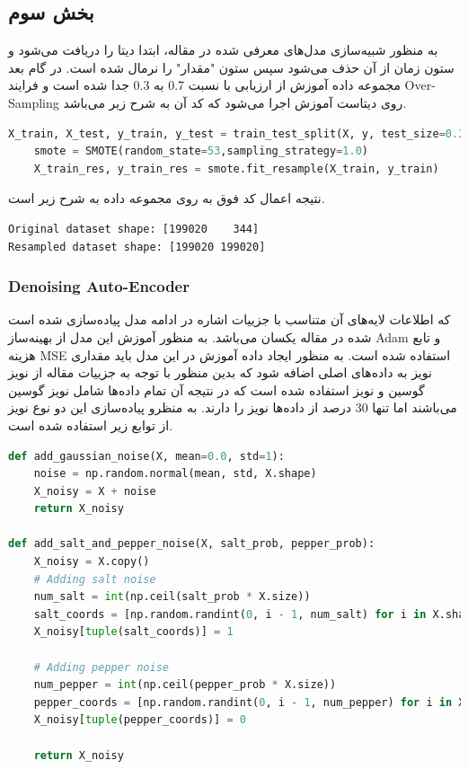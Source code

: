 \documentclass{article}
\begin{document}
\subsection{بخش سوم}
به منظور شبیه‌سازی مدل‌های معرفی شده در مقاله، ابتدا دیتا را دریافت می‌شود و ستون زمان از آن حذف می‌شود سپس ستون "مقدار" را نرمال شده است. در گام بعد مجموعه داده آموزش از ارزیابی با نسبت 0.7 به 0.3 جدا شده است و فرایند 
Over-Sampling
روی دیتاست آموزش اجرا می‌شود که کد آن به شرح زیر می‌باشد.
\begin{LTR}
	\begin{lstlisting}[language=Python, caption=Split data and over-sampling]
	X_train, X_test, y_train, y_test = train_test_split(X, y, test_size=0.3,stratify=y, random_state=53)
	smote = SMOTE(random_state=53,sampling_strategy=1.0)
	X_train_res, y_train_res = smote.fit_resample(X_train, y_train)
	\end{lstlisting}
\end{LTR}
نتیجه اعمال کد فوق به روی مجموعه داده به شرح زیر است.

\begin{LTR}
\begin{verbatim}
Original dataset shape: [199020    344]
Resampled dataset shape: [199020 199020]
\end{verbatim}
\end{LTR}

\subsubsection{Denoising Auto-Encoder}
در ادامه مدل 
پیاده‌سازی شده است ‎که اطلاعات لایه‌های آن متناسب با جزییات اشاره شده در مقاله یکسان می‌باشد. به منظور آموزش این مدل از بهینه‌ساز Adam و تابع هزینه MSE استفاده شده است. به منظور ایجاد داده آموزش در این مدل باید مقداری نویز به داده‌های اصلی اضافه شود که بدین منظور با توجه به جزییات مقاله از نویز گوسین و نویز 
استفاده شده است که در نتیجه آن تمام داده‌ها شامل نویز گوسین می‌باشند اما تنها 30 درصد از داده‌ها نویز 
را دارند. به منظرو پیاده‌سازی این دو نوع نویز از توابع زیر استفاده شده است.
\begin{LTR}
	\begin{lstlisting}[language=Python, caption=Noise generator]
def add_gaussian_noise(X, mean=0.0, std=1):
    noise = np.random.normal(mean, std, X.shape)
    X_noisy = X + noise
    return X_noisy

def add_salt_and_pepper_noise(X, salt_prob, pepper_prob):
    X_noisy = X.copy()
    # Adding salt noise
    num_salt = int(np.ceil(salt_prob * X.size))
    salt_coords = [np.random.randint(0, i - 1, num_salt) for i in X.shape]
    X_noisy[tuple(salt_coords)] = 1

    # Adding pepper noise
    num_pepper = int(np.ceil(pepper_prob * X.size))
    pepper_coords = [np.random.randint(0, i - 1, num_pepper) for i in X.shape]
    X_noisy[tuple(pepper_coords)] = 0

    return X_noisy
	\end{lstlisting}
\end{LTR}
\end{document}
